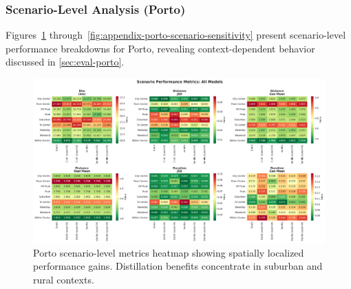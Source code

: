 \subsubsection{Scenario-Level Analysis (Porto)}
\label{app:scenario-porto}

Figures~\ref{fig:appendix-porto-scenario-heatmap} through~\ref{fig:appendix-porto-scenario-sensitivity} present scenario-level performance breakdowns for Porto, revealing context-dependent behavior discussed in \autoref{sec:eval-porto}.

\begin{figure}[H]
    \centering
    \includegraphics[width=0.85\linewidth]{assets/plots/eval/porto/scenarios/scenario_metrics_heatmap.pdf}
    \caption{Porto scenario-level metrics heatmap showing spatially localized performance gains. Distillation benefits concentrate in suburban and rural contexts.}
    \label{fig:appendix-porto-scenario-heatmap}
\end{figure}


